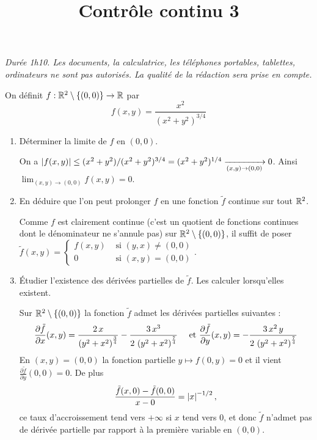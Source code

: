 \documentclass[a4paper]{tp_um}
\title{\large \sffamily\bfseries Contrôle continu 3}
\begin{document}
\maketitle
\textit{Durée 1h10. Les documents, la calculatrice, les téléphones portables, tablettes, ordinateurs ne sont pas autorisés. La qualité de la rédaction sera prise en compte.} 

\bigskip
\bigskip

\exo{} On définit $f:\mathbb{R}^2\setminus\left\{ (0,0) \right\} \to \mathbb{R}$ par 
\[
    f(x,y) = \frac{x^2}{(x^2 + y^2)^{3/4} }
\]
\begin{enumerate}
    \item Déterminer la limite de $f$ en $(0,0)$.
        
        \medskip

        On a $\left\lvert f(x,y)\right\rvert \leq (x^2 + y^2) /(x^2 + y^2)^{3/4} = (x^2 + y^2)^{1/4} \xrightarrow[(x,y)\to(0,0)]{} 0$. Ainsi $\lim_{(x,y)\to(0,0)}f(x,y) = 0$.
        
        \medskip

    \item En déduire que l'on peut prolonger $f$ en une fonction $\tilde f$ continue sur tout $\mathbb{R}^2$.
        
        \medskip

        Comme $f$ est clairement continue (c'est un quotient de fonctions continues dont le dénominateur ne s'annule pas) sur $\mathbb{R}^2\setminus\left\{ (0,0) \right\}$, il suffit de poser $\tilde f(x,y)= \begin{cases}
            f(x,y) &\text{ si } (y,x) \neq (0,0) \\
            0 &\text{ si } (x,y) = (0,0)
        \end{cases}$.
        
        \medskip

    \item \'Etudier l'existence des dérivées partielles de $\tilde f$. Les calculer lorsqu'elles existent.
        
        \medskip

        Sur $\mathbb{R}^2\setminus\left\{ (0,0) \right\} $ la fonction $\tilde f$ admet les dérivées partielles suivantes : 
        \[
            \frac{\partial \tilde f}{\partial x}(x,y) = {{2\,x}\over{\left(y^2+x^2\right)^{{{3}\over{4}}}}}-{{3\,x^3}\over{
 2\,\left(y^2+x^2\right)^{{{7}\over{4}}}}}   \quad \text{ et }  \frac{\partial \tilde f}{\partial y}(x,y)  = -{{3\,x^2\,y}\over{2\,\left(y^2+x^2\right)^{{{7}\over{4}}}}}
        \]
        En $(x,y) = (0,0)$ la fonction partielle $y \mapsto f(0,y) = 0$  et il vient $\frac{\partial \tilde f}{\partial y}(0,0) = 0$. De plus 
        \[
            \frac{ \tilde f(x,0) - \tilde f(0,0) }{x - 0} = \left\lvert x\right\rvert^{-1/2}, 
        \]
ce taux d'accroissement tend vers $+\infty$ si $x$ tend vers $0$, et donc $\tilde f$ n'admet pas de dérivée partielle par rapport à la première variable en $(0,0)$.
        

\end{enumerate}
\end{document}
